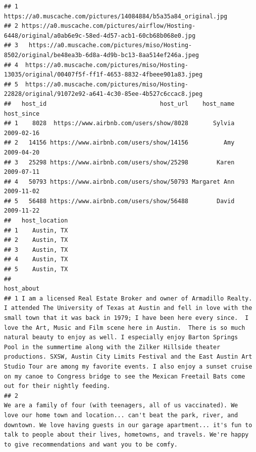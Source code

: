\documentclass[
]{article}
\begin{document}
\begin{verbatim}
## 1                                         https://a0.muscache.com/pictures/14084884/b5a35a84_original.jpg
## 2 https://a0.muscache.com/pictures/airflow/Hosting-6448/original/a0ab6e9c-58ed-4d57-acb1-60cb68b068e0.jpg
## 3   https://a0.muscache.com/pictures/miso/Hosting-8502/original/be48ea3b-6d8a-4d9b-bc13-8aa514ef246a.jpeg
## 4  https://a0.muscache.com/pictures/miso/Hosting-13035/original/00407f5f-ff1f-4653-8832-4fbeee901a83.jpeg
## 5  https://a0.muscache.com/pictures/miso/Hosting-22828/original/91072e92-a641-4c30-85ee-4b527c6ccac8.jpeg
##   host_id                                host_url    host_name host_since
## 1    8028  https://www.airbnb.com/users/show/8028       Sylvia 2009-02-16
## 2   14156 https://www.airbnb.com/users/show/14156          Amy 2009-04-20
## 3   25298 https://www.airbnb.com/users/show/25298        Karen 2009-07-11
## 4   50793 https://www.airbnb.com/users/show/50793 Margaret Ann 2009-11-02
## 5   56488 https://www.airbnb.com/users/show/56488        David 2009-11-22
##   host_location
## 1    Austin, TX
## 2    Austin, TX
## 3    Austin, TX
## 4    Austin, TX
## 5    Austin, TX
##                                                                                                                                                                                                                                                                                                                                                                                                                                                                                                                                                                                                                                                                  host_about
## 1 I am a licensed Real Estate Broker and owner of Armadillo Realty.  I attended The University of Texas at Austin and fell in love with the small town that it was back in 1979; I have been here every since.  I love the Art, Music and Film scene here in Austin.  There is so much natural beauty to enjoy as well. I especially enjoy Barton Springs Pool in the summertime along with the Zilker Hillside theater productions. SXSW, Austin City Limits Festival and the East Austin Art Studio Tour are among my favorite events. I also enjoy a sunset cruise on my canoe to Congress bridge to see the Mexican Freetail Bats come out for their nightly feeding.  
## 2                                                                                                                                                                                                                                                                                                                                      We are a family of four (with teenagers, all of us vaccinated). We love our home town and location... can't beat the park, river, and downtown. We love having guests in our garage apartment... it's fun to talk to people about their lives, hometowns, and travels. We're happy to give recommendations and want you to be comfy.

\end{verbatim}
\end{document}
